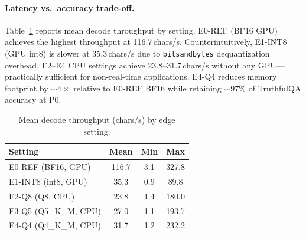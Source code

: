 \documentclass[letterpaper]{article}
\begin{document}
\paragraph{Latency vs.\ accuracy trade-off.}
Table~\ref{tab:latency} reports mean decode throughput by setting.
E0-REF (BF16 GPU) achieves the highest throughput at 116.7\,chars/s.
Counterintuitively, E1-INT8 (GPU int8) is slower at 35.3\,chars/s due to
\texttt{bitsandbytes} dequantization overhead. E2--E4 CPU settings achieve
23.8--31.7\,chars/s without any GPU---practically sufficient for non-real-time
applications. E4-Q4 reduces memory footprint by ${\sim}4\times$ relative to
E0-REF BF16 while retaining ${\sim}$97\% of TruthfulQA accuracy at P0.

\begin{table}[t]
  \small\centering
  \caption{Mean decode throughput (chars/s) by edge setting.}
  \label{tab:latency}
  \begin{tabular}{@{}lccc@{}}
    \toprule
    Setting & Mean & Min & Max \\
    \midrule
    E0-REF (BF16, GPU) & 116.7 & 3.1 & 327.8 \\
    E1-INT8 (int8, GPU) & 35.3 & 0.9 & 89.8 \\
    E2-Q8 (Q8, CPU) & 23.8 & 1.4 & 180.0 \\
    E3-Q5 (Q5\_K\_M, CPU) & 27.0 & 1.1 & 193.7 \\
    E4-Q4 (Q4\_K\_M, CPU) & 31.7 & 1.2 & 232.2 \\
    \bottomrule
  \end{tabular}
\end{table}
\end{document}
